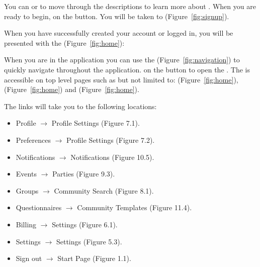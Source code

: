 
You can  or  to move through the descriptions to learn more about \Friending.  When you are ready to begin,  on the  button.  You will be taken to  (Figure~\ref{fig:signup}).

When you have successfully created your account or logged in, you will be presented with the  (Figure~\ref{fig:home}):


When you are in the application you can use the  (Figure~\ref{fig:navigation}) to quickly navigate throughout the application.   on the  button to open the .   The  is accessible on top level pages such as but not limited to:  (Figure~\ref{fig:home}),  (Figure~\ref{fig:home}) and  (Figure~\ref{fig:home}).


The links will take you to the following locations:

\begin{itemize}
\item Profile $\rightarrow$ Profile Settings (Figure 7.1).
\item Preferences $\rightarrow$ Profile Settings (Figure 7.2).
\item Notifications $\rightarrow$ Notifications (Figure 10.5).
\item Events $\rightarrow$ Parties (Figure 9.3).
\item Groups $\rightarrow$ Community Search (Figure 8.1).
\item Questionnaires $\rightarrow$ Community Templates (Figure 11.4).
\item Billing $\rightarrow$ Settings (Figure 6.1).
\item Settings $\rightarrow$ Settings (Figure 5.3).
\item Sign out $\rightarrow$ Start Page (Figure 1.1).
\end{itemize}


